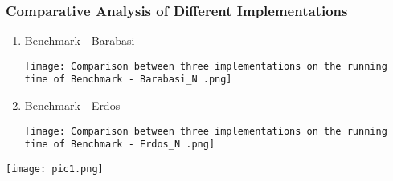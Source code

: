 \documentclass{article}
\begin{document}
    \subsubsection{Comparative Analysis of Different Implementations}
    \begin{enumerate}
        \item Benchmark - Barabasi
        \begin{center}
            \texttt{[image: Comparison between three implementations on the running time of Benchmark - Barabasi\_N .png]}
        \end{center}
        
        \item Benchmark - Erdos
        \begin{center}
            \texttt{[image: Comparison between three implementations on the running time of Benchmark - Erdos\_N .png]}
        \end{center}
    \end{enumerate}
    
    \clearpage
    
    
    
    \begin{center}
            \texttt{[image: pic1.png]}
        \end{center}
\end{document}
